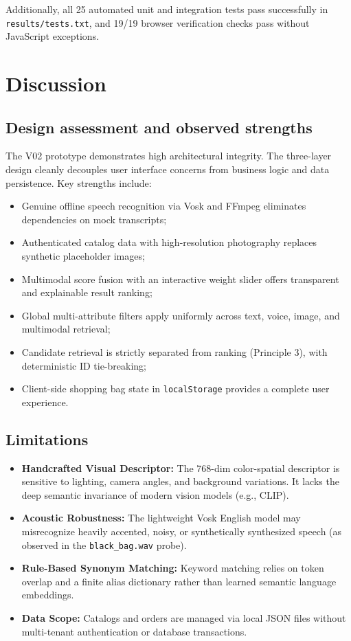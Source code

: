 \documentclass[12pt,a4paper]{article}
\newcommand{\code}[1]{\texttt{#1}}
\begin{document}
Additionally, all 25 automated unit and integration tests pass successfully in \code{results/tests.txt}, and 19/19 browser verification checks pass without JavaScript exceptions.

\FloatBarrier
\section{Discussion}\label{sec:discussion}

\subsection{Design assessment and observed strengths}
The V02 prototype demonstrates high architectural integrity. The three-layer design cleanly decouples user interface concerns from business logic and data persistence. Key strengths include:
\begin{itemize}
\item Genuine offline speech recognition via Vosk and FFmpeg eliminates dependencies on mock transcripts;
\item Authenticated catalog data with high-resolution photography replaces synthetic placeholder images;
\item Multimodal score fusion with an interactive weight slider offers transparent and explainable result ranking;
\item Global multi-attribute filters apply uniformly across text, voice, image, and multimodal retrieval;
\item Candidate retrieval is strictly separated from ranking (Principle 3), with deterministic ID tie-breaking;
\item Client-side shopping bag state in \texttt{localStorage} provides a complete user experience.
\end{itemize}

\subsection{Limitations}
\begin{itemize}
\item \textbf{Handcrafted Visual Descriptor:} The 768-dim color-spatial descriptor is sensitive to lighting, camera angles, and background variations. It lacks the deep semantic invariance of modern vision models (e.g., CLIP).
\item \textbf{Acoustic Robustness:} The lightweight Vosk English model may misrecognize heavily accented, noisy, or synthetically synthesized speech (as observed in the \code{black\_bag.wav} probe).
\item \textbf{Rule-Based Synonym Matching:} Keyword matching relies on token overlap and a finite alias dictionary rather than learned semantic language embeddings.
\item \textbf{Data Scope:} Catalogs and orders are managed via local JSON files without multi-tenant authentication or database transactions.
\end{itemize}
\end{document}
